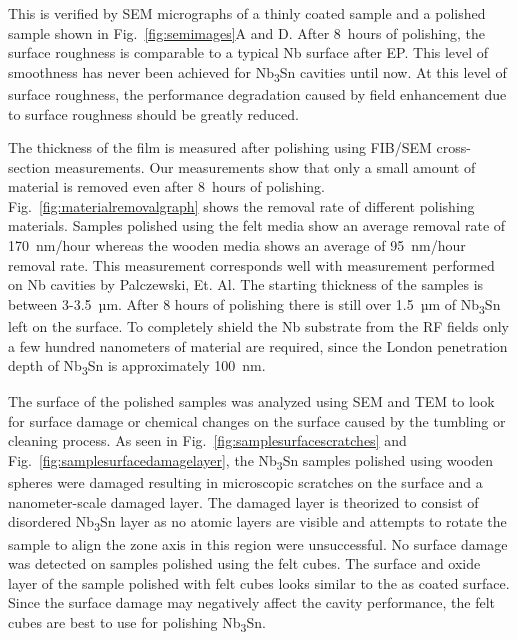 This is verified by SEM micrographs of a thinly coated sample and a polished sample shown in Fig.~\ref{fig:semimages}A and D. After 8~hours of polishing, the surface roughness is comparable to a typical Nb surface after EP. This level of smoothness has never been achieved for Nb\textsubscript{3}Sn cavities until now. At this level of surface roughness, the performance degradation caused by field enhancement due to surface roughness should be greatly reduced.

The thickness of the film is measured after polishing using FIB/SEM cross-section measurements. Our measurements show that only a small amount of material is removed even after 8~hours of polishing. Fig.~\ref{fig:materialremovalgraph} shows the removal rate of different polishing materials. Samples polished using the felt media show an average removal rate of 170~nm/hour whereas the wooden media shows an average of 95~nm/hour removal rate. This measurement corresponds well with measurement performed on Nb cavities by Palczewski, Et. Al.\cite{palczewski2013exploration} The starting thickness of the samples is between 3-3.5~µm. After 8 hours of polishing there is still over 1.5~µm of Nb\textsubscript{3}Sn left on the surface. To completely shield the Nb substrate from the RF fields only a few hundred nanometers of material are required, since the London penetration depth of Nb\textsubscript{3}Sn is approximately 100~nm\cite{liarte2017theoretical}.

The surface of the polished samples was analyzed using SEM and TEM to look for surface damage or chemical changes on the surface caused by the tumbling or cleaning process. As seen in Fig.~\ref{fig:samplesurfacescratches} and Fig.~\ref{fig:samplesurfacedamagelayer}, the Nb\textsubscript{3}Sn samples polished using wooden spheres were damaged resulting in microscopic scratches on the surface and a nanometer-scale damaged layer. The damaged layer is theorized to consist of disordered Nb\textsubscript{3}Sn layer as no atomic layers are visible and attempts to rotate the sample to align the zone axis in this region were unsuccessful. No surface damage was detected on samples polished using the felt cubes. The surface and oxide layer of the sample polished with felt cubes looks similar to the as coated surface\cite{sun2023surface,cano2023selective}. Since the surface damage may negatively affect the cavity performance, the felt cubes are best to use for polishing Nb\textsubscript{3}Sn.
%




%


